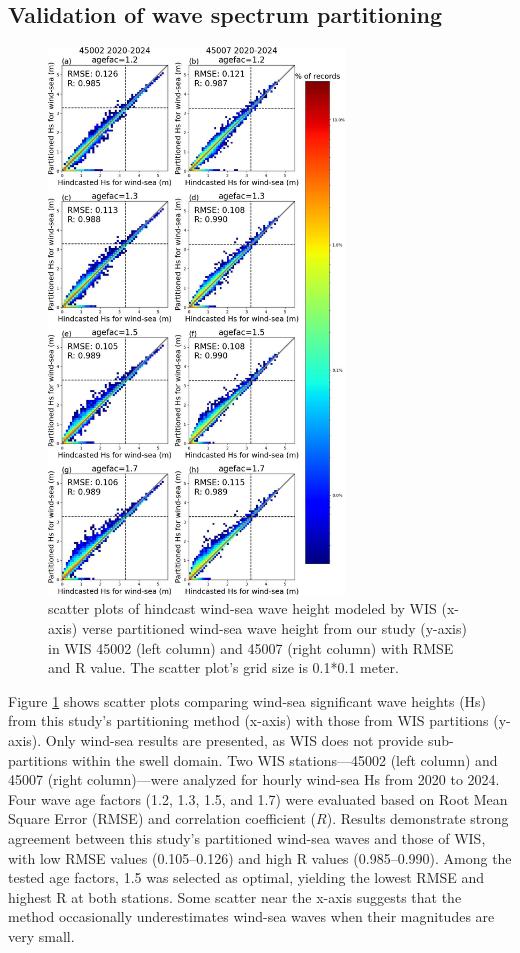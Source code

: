 \subsection{Validation of wave spectrum partitioning}
\label{Validation of wave spectrum partitioning}

\begin{figure}[htbp]
  \centering
  \includegraphics[width=0.7\textwidth]{chapter4/resources/figure4-4.jpg}
  \caption{scatter plots of hindcast wind-sea wave height modeled by WIS
  (x-axis) verse partitioned wind-sea wave height from our study (y-axis) in WIS
  45002 (left column) and 45007 (right column) with RMSE and R value. The
  scatter plot’s grid size is 0.1*0.1 meter.}
  \label{fig:fig4.4}
\end{figure}

Figure \ref{fig:fig4.4} shows scatter plots comparing wind-sea significant wave
heights (Hs) from this study’s partitioning method (x-axis) with those from WIS
partitions (y-axis). Only wind-sea results are presented, as WIS does not
provide sub-partitions within the swell domain. Two WIS stations—45002 (left
column) and 45007 (right column)—were analyzed for hourly wind-sea Hs from 2020
to 2024. Four wave age factors (1.2, 1.3, 1.5, and 1.7) were evaluated based on
Root Mean Square Error (RMSE) and correlation coefficient ($R$). Results
demonstrate strong agreement between this study’s partitioned wind-sea waves and
those of WIS, with low RMSE values (0.105–0.126) and high R values
(0.985–0.990). Among the tested age factors, 1.5 was selected as optimal,
yielding the lowest RMSE and highest R at both stations. Some scatter near the
x-axis suggests that the method occasionally underestimates wind-sea waves when
their magnitudes are very small.

